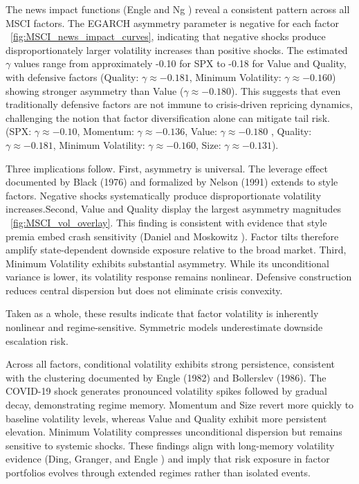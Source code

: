 \documentclass{article}
\begin{document}
The news impact functions (Engle and Ng \cite{engle1993}) reveal a consistent pattern across all MSCI factors. The EGARCH asymmetry parameter is negative for each factor ~\ref{fig:MSCI_news_impact_curves}, indicating that negative shocks produce disproportionately larger volatility increases than positive shocks. The estimated $\gamma$ values range from approximately -0.10 for SPX to -0.18 for Value and Quality, with defensive factors (Quality: $\gamma \approx -0.181$, Minimum Volatility: $\gamma \approx -0.160$) showing stronger asymmetry than Value ($\gamma \approx -0.180$). This suggests that even traditionally defensive factors are not immune to crisis-driven repricing dynamics, challenging the notion that factor diversification alone can mitigate tail risk. (SPX: $\gamma \approx -0.10$, Momentum: $\gamma \approx -0.136$, Value: $\gamma \approx -0.180$
, Quality: $\gamma \approx -0.181$, Minimum Volatility: $\gamma \approx -0.160$, Size: $\gamma \approx -0.131$).\newline

Three implications follow. First, asymmetry is universal. The leverage effect documented by Black (1976) and formalized by Nelson (1991) extends to style factors. Negative shocks systematically produce disproportionate volatility increases.Second, Value and Quality display the largest asymmetry magnitudes ~\ref{fig:MSCI_vol_overlay}. This finding is consistent with evidence that style premia embed crash sensitivity (Daniel and Moskowitz \cite{daniel2016}). Factor tilts therefore amplify state-dependent downside exposure relative to the broad market. Third, Minimum Volatility exhibits substantial asymmetry. While its unconditional variance is lower, its volatility response remains nonlinear. Defensive construction reduces central dispersion but does not eliminate crisis convexity.\newline

Taken as a whole, these results indicate that factor volatility is inherently nonlinear and regime-sensitive. Symmetric models underestimate downside escalation risk.\newline

Across all factors, conditional volatility exhibits strong persistence, consistent with the clustering documented by Engle (1982) and Bollerslev (1986). The COVID-19 shock generates pronounced volatility spikes followed by gradual decay, demonstrating regime memory. Momentum and Size revert more quickly to baseline volatility levels, whereas Value and Quality exhibit more persistent elevation. Minimum Volatility compresses unconditional dispersion but remains sensitive to systemic shocks. These findings align with long-memory volatility evidence (Ding, Granger, and Engle \cite{ding1993}) and imply that risk exposure in factor portfolios evolves through extended regimes rather than isolated events.\newline
\end{document}
